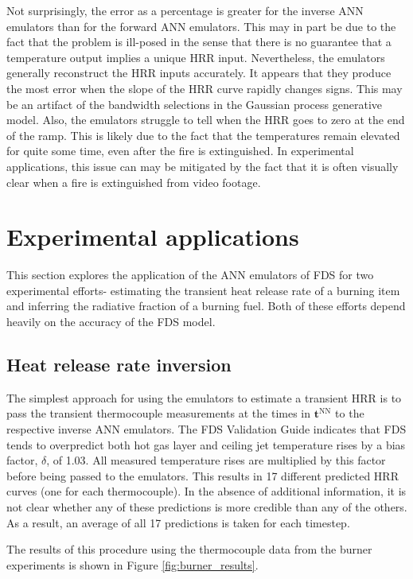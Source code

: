 \documentclass{article}
\begin{document}
Not surprisingly, the error as a percentage is greater for the inverse ANN emulators than for the forward ANN emulators. This may in part be due to the fact that the problem is ill-posed in the sense that there is no guarantee that a temperature output implies a unique HRR input. Nevertheless, the emulators generally reconstruct the HRR inputs accurately. It appears that they produce the most error when the slope of the HRR curve rapidly changes signs. This may be an artifact of the bandwidth selections in the Gaussian process generative model. Also, the emulators struggle to tell when the HRR goes to zero at the end of the ramp. This is likely due to the fact that the temperatures remain elevated for quite some time, even after the fire is extinguished. In experimental applications, this issue can may be mitigated by the fact that it is often visually clear when a fire is extinguished from video footage.
\section{Experimental applications}
This section explores the application of the ANN emulators of FDS for two experimental efforts- estimating the transient heat release rate of a burning item and inferring the radiative fraction of a burning fuel. Both of these efforts depend heavily on the accuracy of the FDS model. 

\subsection{Heat release rate inversion}
The simplest approach for using the emulators to estimate a transient HRR is to pass the transient thermocouple measurements at the times in $\boldsymbol{t}^\text{NN}$ to the respective inverse ANN emulators. The FDS Validation Guide \cite{mcgrattan2020fire} indicates that FDS tends to overpredict both hot gas layer and ceiling jet temperature rises by a bias factor, $\delta$, of 1.03. All measured temperature rises are multiplied by this factor before being passed to the emulators. This results in 17 different predicted HRR curves (one for each thermocouple). In the absence of additional information, it is not clear whether any of these predictions is more credible than any of the others. As a result, an average of all 17 predictions is taken for each timestep. 

The results of this procedure using the thermocouple data from the burner experiments is shown in Figure \ref{fig:burner_results}.
\end{document}
